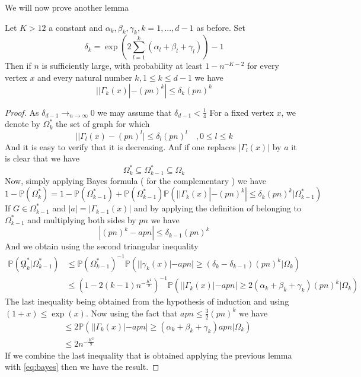 We will now prove another lemma
\begin{lemma}
	Let $K > 12$ a constant and $\alpha_k, \beta_k, \gamma_k, k=1,...,d-1$ as before.
	\newline
	Set 
	\begin{equation}
		\delta_k = \exp(2\sum_{l=1}^{k}(\alpha_l + \beta_l +\gamma_l)) - 1
	\end{equation}
	Then if $n$ is sufficiently large, with probability at least $1-n^{-K-2}$ for every vertex $x$ and every natural number $k, 1\leq k \leq d-1$ we have
	\begin{equation}
		||\Gamma_k(x)| - (pn)^k| \leq \delta_k(pn)^k
	\end{equation}
\end{lemma}

\begin{proof}
	As $\delta_{d-1} \longrightarrow_{n\to\infty} 0$ we may assume that $\delta_{d-1} < \frac{1}{4}$
	For a fixed vertex $x$, we denote by $\Omega_k^*$ the set of graph for which 
	\begin{equation}
		||\Gamma_l(x) - (pn)^l| \leq \delta_l(pn)^l \quad , 0 \leq l \leq k
	\end{equation}
	And it is easy to verify that it is decreasing. Anf if one replaces $|\Gamma_l(x)|$ by $a$ it is clear that we have
	\begin{equation}
		\Omega_k^* \subseteq \Omega_{k-1}^* \subseteq \Omega_k
	\end{equation}
	Now, simply applying Bayes formula ( for the complementary ) we have
	\begin{equation}\label{eq:bayes}
		1 - \mathbb{P}(\Omega_k^*)= 1-\mathbb{P}(\Omega_{k-1}^*)
		+ \mathbb{P}(\Omega_{k-1}^*)\mathbb{P}(||\Gamma_k(x)| - (pn)^k| \leq \delta_k(pn)^k | \Omega_{k-1}^*)
	\end{equation}
	If $G \in \Omega_{k-1}^*$ and $|a| = |\Gamma_{k-1}(x)|$ and by applying the definition of belonging to $\Omega_{k-1}^*$ and multiplying both sides by $pn$ we have 
	\begin{equation}
		|(pn)^k - apn| \leq \delta_{k-1}(pn)^k
	\end{equation}
	And we obtain using the second triangular inequality
	\begin{align}
		\mathbb{P}(\not\Omega_k^* | \Omega_{k-1}^*) 
		&\leq \mathbb{P}(\Omega_{k-1}^*)^{-1}\mathbb{P}(||\gamma_k(x)| - apn| \geq (\delta_k - \delta_{k-1})(pn)^k | \Omega_k)\\
		&\leq (1 - 2(k-1)n^{-\frac{K^2}{9}})^{-1}\mathbb{P}(||\Gamma_k(x)| - apn| \geq 2(\alpha_k + \beta_k + \gamma_k)(pn)^k | \Omega_k)
	\end{align}
	The last inequality being obtained from the hypothesis of induction and using $(1+x) \leq \exp(x)$. Now using the fact that $apn \leq \frac{3}{2} (pn)^k$ we have
	\begin{align}
		&\leq 2\mathbb{P}(||\Gamma_k(x)| - apn| \geq (\alpha_k + \beta_k + \gamma_k)apn | \Omega_k)\\
		&\leq 2n^{-\frac{K^2}{9}}
	\end{align}
	If we combine the last inequality that is obtained applying the previous lemma with \ref{eq:bayes} then we have the result.
\end{proof}
